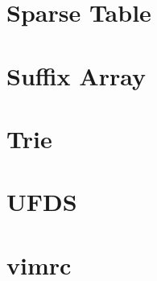 \documentclass[]{article}
\begin{document}
\begin{multicols*}{2}
{    \section{Sparse Table}
    
    \section{Suffix Array}
    
    \section{Trie}
    
    \section{UFDS}
    
    \section{vimrc}
    
}
\end{multicols*}
\end{document}
